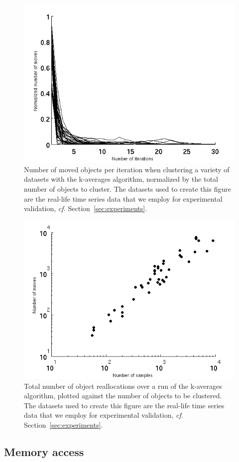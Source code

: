 \documentclass[natbib,smallextended]{svjour3}
\begin{document}
\begin{figure}
\center
\includegraphics[width = .65\textwidth]{figures/iterMove.png}
\caption{Number of moved objects per iteration when clustering a variety of datasets with the k-averages algorithm, normalized by the total number of objects to cluster. The datasets used to create this figure are the real-life time series data that we employ for experimental validation, \textit{cf.} Section~\ref{sec:experiments}.}
\label{fig:moved}
\end{figure}

\begin{figure}
\center
\includegraphics[width = .65\textwidth]{figures/sampleMove.png}
\caption{Total number of object reallocations over a run of the k-averages algorithm, plotted against the number of objects to be clustered. The datasets used to create this figure are the real-life time series data that we employ for experimental validation, \textit{cf.} Section~\ref{sec:experiments}.}
\label{fig:totalMoved}
\end{figure}

\subsection{Memory access}
\end{document}
